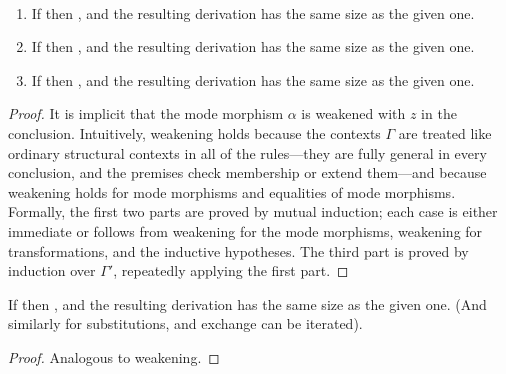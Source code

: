 \begin{lemma} ~ \label{lem:weakening} ~
\begin{enumerate}
\item If  then
, and the resulting
derivation has the same size as the given one.  
\item If  then
, and the resulting
derivation has the same size as the given one.  
\item If  then
, and the resulting
derivation has the same size as the given one.  
\end{enumerate}
\end{lemma}
\begin{proof}
It is implicit that the mode morphism $\alpha$ is weakened with $z$ in
the conclusion.  Intuitively, weakening holds because the contexts
$\Gamma$ are treated like ordinary structural contexts in all of the
rules---they are fully general in every conclusion, and the premises
check membership or extend them---and because weakening holds for mode
morphisms and equalities of mode morphisms.  Formally, the first two
parts are proved by mutual induction; each case is either immediate
or follows from weakening for the mode morphisms, weakening for
transformations, and the inductive hypotheses.  The third
part is proved by induction over $\Gamma'$, repeatedly applying the
first part.  
\end{proof}

\begin{lemma} \label{lem:exchange}
If  then
, and the resulting derivation
has the same size as the given one.  (And similarly for substitutions,
and exchange can be iterated).  
\end{lemma}
\begin{proof} Analogous to weakening.  
\end{proof}

